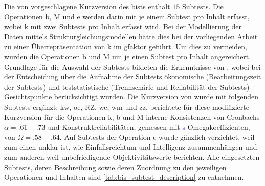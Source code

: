 \documentclass[11pt, twoside, a4paper]{book}		%
\begin{document}
Die von \citet{Jaeger1997} vorgeschlagene Kurzversion des \gls{bist}s enthält $15$ Subtests. Die Operationen \gls{b}, \gls{M} und \gls{e} werden darin mit je einem Subtest pro Inhalt erfasst, wobei \gls{k} mit zwei Subtests pro Inhalt erfasst wird. Bei der Modellierung der Daten mittels Strukturgleichungsmodellen hätte dies bei der vorliegenden Arbeit zu einer Überrepräsentation von \gls{k} im \gls{gfaktor} geführt. Um dies zu vermeiden, wurden die Operationen \gls{b} und \gls{M} um je einen Subtest pro Inhalt angereichert. Grundlage für die Auswahl der Subtests bildeten die Erkenntnisse von \citet{Wicki2014}, wobei bei der Entscheidung über die Aufnahme der Subtests ökonomische (Bearbeitungszeit der Subtests) und teststatistische (Trennschärfe und Reliabilität der Subtests)  Gesichtspunkte berücksichtigt wurden. Die Kurzversion von \citet{Jaeger1997} wurde mit folgenden Subtests ergänzt: \gls{kw}, \gls{oe}, \gls{RZ}, \gls{we}, \gls{wm} und \gls{zz}. 
\citet{Wicki2014} berichtete für diese modifizierte Kurzversion für die Operationen \gls{k}, \gls{b} und \gls{M} interne Konsistenzen von Cronbachs $\alpha=.61-.73$ und Konstruktreliabilitäten, gemessen mit \citeauthor{McDonald1999}\textcolor{blue}{s} \citeyearpar{McDonald1999} Omegakoeffizienten, von $\Omega = .58-.64$.
Auf Subtests der Operation \gls{e} wurde gänzlich verzichtet, weil zum einen unklar ist, wie Einfallsreichtum und Intelligenz zusammenhängen \citep{Kim2005} und zum anderen weil \citet{Jaeger1997} unbefriedigende Objektivitätswerte berichten. 
Alle eingesetzten Subtests, deren Beschreibung sowie deren Zuordnung zu den jeweiligen Operationen und Inhalten sind \autoref{tab:bis_subtest_description} zu entnehmen.
\end{document}
